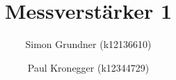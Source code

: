 \documentclass[a4paper,oneside,11pt,ngerman]{scrartcl}
\begin{document}
\title{Messverstärker 1}
\author{Simon Grundner (k12136610) \and Paul Kronegger (k12344729)}


\tableofcontents









\end{document}
